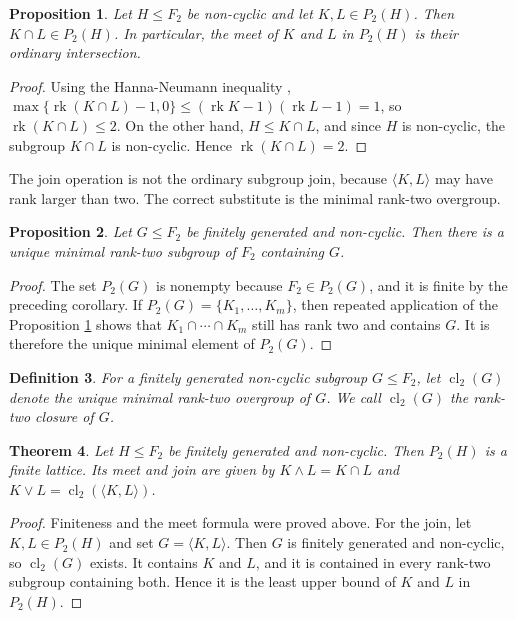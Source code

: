\documentclass{amsproc}
\newtheorem{theorem}{Theorem}[section]
\newtheorem{proposition}[theorem]{Proposition}
\newtheorem{definition}[theorem]{Definition}
\newcommand{\rk}{\operatorname{rk}}
\begin{document}
\begin{proposition} \label{P.meet}
Let $H\leq F_2$ be non-cyclic and let $K,L\in P_2(H)$.  Then
$K\cap L\in P_2(H)$.  In particular, the meet of $K$ and $L$ in $P_2(H)$ is
their ordinary intersection.
\end{proposition}

\begin{proof}
Using the  Hanna-Neumann inequality \cite{Mineyev},
$\max\{\rk(K\cap L)-1,0\}\leq (\rk K-1)(\rk L-1)=1$, so $\rk(K\cap L)\leq 2$.
On the other hand, $H\leq K\cap L$, and since $H$ is non-cyclic, the subgroup
$K\cap L$ is non-cyclic.  Hence $\rk(K\cap L)=2$.
\end{proof}

The join operation is not the ordinary subgroup join, because $\langle K,L\rangle$
may have rank larger than two.  The correct substitute is the minimal rank-two
overgroup.

\begin{proposition}
Let $G\leq F_2$ be finitely generated and non-cyclic.  Then there is a unique
minimal rank-two subgroup of $F_2$ containing $G$.
\end{proposition}

\begin{proof}
The set $P_2(G)$ is nonempty because $F_2\in P_2(G)$, and it is finite by the
preceding corollary.  If $P_2(G)=\{K_1,\dots,K_m\}$, then repeated application
of the Proposition \ref{P.meet} shows that $K_1\cap\cdots\cap K_m$ still has rank two
and contains $G$.  It is therefore the unique minimal element of $P_2(G)$.
\end{proof}

\begin{definition}
For a finitely generated non-cyclic subgroup $G\leq F_2$, let
$\operatorname{cl}_2(G)$ denote the unique minimal rank-two overgroup of $G$.
We call $\operatorname{cl}_2(G)$ the \emph{rank-two closure} of $G$.
\end{definition}

\begin{theorem}
Let $H\leq F_2$ be finitely generated and non-cyclic.  Then $P_2(H)$ is a
finite lattice.  Its meet and join are given by
$K\wedge L=K\cap L$ and $K\vee L=\operatorname{cl}_2(\langle K,L\rangle)$.
\end{theorem}

\begin{proof}
Finiteness and the meet formula were proved above.  For the join, let
$K,L\in P_2(H)$ and set $G=\langle K,L\rangle$.  Then $G$ is finitely generated
and non-cyclic, so $\operatorname{cl}_2(G)$ exists.  It contains $K$ and $L$,
and it is contained in every rank-two subgroup containing both.  Hence it is
the least upper bound of $K$ and $L$ in $P_2(H)$.
\end{proof}
\end{document}
